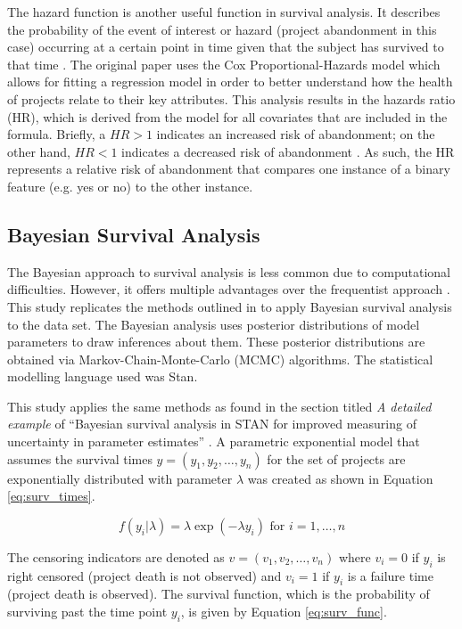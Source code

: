 \documentclass[sigconf]{acmart}
\begin{document}
The hazard function is another useful function in survival analysis. It describes the probability of the event of interest or hazard (project abandonment in this case) occurring at a certain point in time given that the subject has survived to that time \cite{clark2003go}.
The original paper uses the Cox Proportional-Hazards model which allows for fitting a regression model in order to better understand how the health of projects relate to their key attributes. 
This analysis results in the hazards ratio (HR), which is derived from the model for all covariates that are included in the formula. 
Briefly, a $HR > 1$ indicates an increased risk of abandonment; on the other hand, $HR < 1$ indicates a decreased risk of abandonment \cite{cox1972regression}. 
As such, the HR represents a relative risk of abandonment that compares one instance of a binary feature (e.g. yes or no) to the other instance.

\subsection{Bayesian Survival Analysis} \label{bayes_surv_analysis}

The Bayesian approach to survival analysis is less common due to computational difficulties. 
However, it offers multiple advantages over the frequentist approach \cite{kelter2020bayesian}. 
This study replicates the methods outlined in \cite{kelter2020bayesian} to apply Bayesian survival analysis to the data set.
The Bayesian analysis uses posterior distributions of model parameters to draw inferences about them. 
These posterior distributions are obtained via Markov-Chain-Monte-Carlo (MCMC) algorithms. 
The statistical modelling language used was Stan.

This study applies the same methods as found in the section titled \emph{A detailed example} of ``Bayesian survival analysis in STAN for improved measuring of uncertainty in parameter estimates'' \cite{kelter2020bayesian}. 
A parametric exponential model that assumes the survival times $y = (y_1, y_2, \dots, y_n)$ for the set of projects are exponentially distributed with parameter $\lambda$ was created as shown in Equation \ref{eq:surv_times}.

\begin{equation} \label{eq:surv_times}
    f(y_i|\lambda) = \lambda\exp(- \lambda y_i) \mbox{ for } i=1,\dots,n
\end{equation}

The censoring indicators are denoted as $v = (v_1, v_2,\dots, v_n)$ where $v_i = 0$ if $y_i$ is right censored (project death is not observed) and $v_i = 1$ if $y_i$ is a failure time (project death is observed). The survival function, which is the probability of surviving past the time point $y_i$, is given by Equation \ref{eq:surv_func}.
\end{document}
